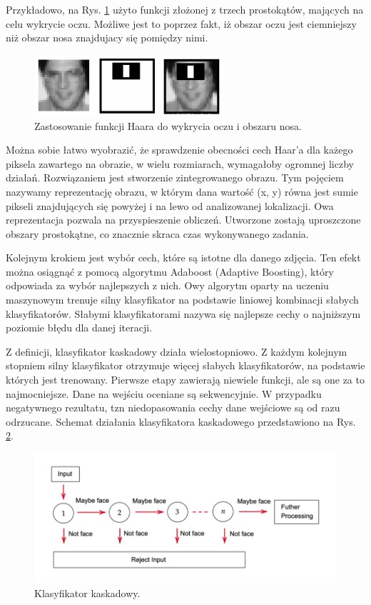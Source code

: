  Przykładowo, na Rys. \ref{fig:haarNose} użyto funkcji złożonej z trzech prostokątów, mających na celu wykrycie oczu. Możliwe jest to poprzez fakt, iż obszar oczu jest ciemniejszy niż obszar nosa znajdujacy się pomiędzy nimi.
 
  \begin{figure}[h]
	\centering
	\includegraphics[width=7cm]{haar_nose_feature.png}
	\caption{Zastosowanie funkcji Haara do wykrycia oczu i obszaru nosa.} 
	\label{fig:haarNose}
\end{figure}
 
 Można sobie łatwo wyobrazić, że sprawdzenie obecności cech Haar'a dla każego piksela zawartego na obrazie, w wielu rozmiarach, wymagałoby ogromnej liczby działań. Rozwiązaniem jest stworzenie zintegrowanego obrazu. Tym pojęciem nazywamy reprezentację obrazu, w którym dana wartość (x, y) równa jest sumie pikseli znajdujących się powyżej i na lewo od analizowanej lokalizacji. Owa reprezentacja pozwala na przyspieszenie obliczeń. Utworzone zostają uproszczone obszary prostokątne, co znacznie skraca czas wykonywanego zadania.
 
 
 Kolejnym krokiem jest wybór cech, które są istotne dla danego zdjęcia. Ten efekt można osiągnąć z pomocą algorytmu Adaboost (Adaptive Boosting), który odpowiada za wybór najlepszych z nich. Owy algorytm oparty na uczeniu maszynowym trenuje silny klasyfikator na podstawie liniowej kombinacji słabych klasyfikatorów. Słabymi klasyfikatorami nazywa się najlepsze cechy o najniższym poziomie błędu dla danej iteracji.
 
Z definicji, klasyfikator kaskadowy działa wielostopniowo. Z każdym kolejnym stopniem silny klasyfikator otrzymuje więcej słabych klasyfikatorów, na podstawie których jest trenowany. Pierwsze etapy zawierają niewiele funkcji, ale są one za to najmocniejsze. Dane na wejściu oceniane są sekwencyjnie. W przypadku negatywnego rezultatu, tzn niedopasowania cechy dane wejściowe są od razu odrzucane. Schemat działania klasyfikatora kaskadowego przedstawiono na Rys. \ref{fig:cascadeClasificator}.  
 
   \begin{figure}[h]
	\centering
	\includegraphics[width=12cm]{haar_train.png}
	\caption{Klasyfikator kaskadowy.} 
	\label{fig:cascadeClasificator}
\end{figure}
 
